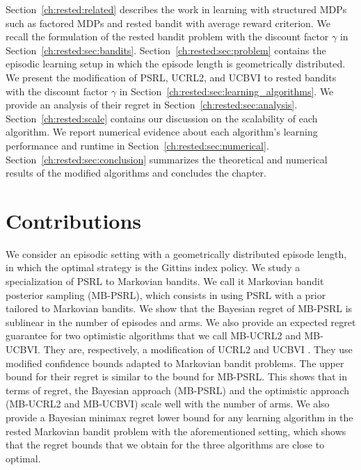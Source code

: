Section~\ref{ch:rested:related} describes the work in learning with structured MDPs such as factored MDPs and rested bandit with average reward criterion.
We recall the formulation of the rested bandit problem with the discount factor $\gamma$ in Section~\ref{ch:rested:sec:bandits}.
Section~\ref{ch:rested:sec:problem} contains the episodic learning setup in which the episode length is geometrically distributed.
We present the modification of PSRL, UCRL2, and UCBVI to rested bandits with the discount factor $\gamma$ in Section~\ref{ch:rested:sec:learning_algorithms}.
We provide an analysis of their regret in Section~\ref{ch:rested:sec:analysis}.
Section~\ref{ch:rested:scale} contains our discussion on the scalability of each algorithm.
We report numerical evidence about each algorithm's learning performance and runtime in Section~\ref{ch:rested:sec:numerical}.
Section~\ref{ch:rested:sec:conclusion} summarizes the theoretical and numerical results of the modified algorithms and concludes the chapter.

\section{Contributions}
\label{ch:rested:sec:contribute}

We consider an episodic setting with a geometrically distributed episode length, in which the optimal strategy is the Gittins index policy. %
We study a specialization of PSRL \cite{osband2013more} to Markovian bandits.
We call it Markovian bandit posterior sampling (MB-PSRL), which consists in using PSRL with a prior tailored to Markovian bandits.
We show that the Bayesian regret of MB-PSRL is sublinear in the number of episodes and arms. We also provide an expected regret guarantee for two optimistic algorithms that we call MB-UCRL2 and MB-UCBVI.
They are, respectively, a modification of UCRL2 \cite{jaksch2010near} and UCBVI \cite{azar2017minimax}.
They use modified confidence bounds adapted to Markovian bandit problems. The upper bound for their regret is similar to the bound for MB-PSRL. This shows that in terms of regret, the Bayesian approach (MB-PSRL) and the optimistic approach (MB-UCRL2 and MB-UCBVI) scale well with the number of arms. We also provide a Bayesian minimax regret lower bound for any learning algorithm in the rested Markovian bandit problem with the aforementioned setting, which shows that the regret bounds that we obtain for the three algorithms are close to optimal.

